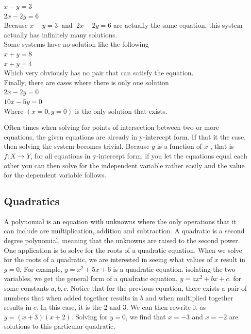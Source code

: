 \documentclass[12pt]{report}
\begin{document}
$x-y=3$\\
$2x-2y=6$\\
Because $x-y=3~$ and $~2x-2y=6$ are actually the same equation, this system actually has infinitely many solutions.\\
Some systems have no solution like the following\\
$x+y=8$\\
$x+y=4$\\
Which very obviously has no pair that can satisfy the equation.\\
Finally, there are cases where there is only one solution\\
$2x - 2y = 0$\\
$10x - 5y = 0$\\
Where $(x=0, y=0)$ is the only solution that exists.

Often times when solving for points of intersection between two or more equations, the given equations are already in y-intercept form. If that it the case, then solving the system becomes trivial. Because $y$ is a function of $x$ , that is $f: X \rightarrow Y$, for all equations in y-intercept form, if you let the equations equal each other you can then solve for the independent variable rather easily and the value for the dependent variable follows.

\subsection{Quadratics}

\hspace{\parindent}A polynomial is an equation with unknowns where the only operations that it can include are multiplication, addition and subtraction.
A quadratic is a second degree polynomial, meaning  that the unknowns are raised to the second power. One application is to solve for the roots of a quadratic equation. When we solve for the roots of a quadratic, we are interested in seeing what values of $x$ result in $y=0$. For example, $y=x^2+5x+6$ is a quadratic equation.
isolating the two variables, we get the general form of a quadratic equation, $y=ax^2+bx+c$. for some constants $a, b, c$. Notice that for the previous equation, there exists a pair of numbers that when added together results in $b$ and when multiplied together results in $c$. In this case, it is the $2$ and $3$. We can then rewrite it as $y=(x+3)(x+2)$. Solving for $y=0$, we find that $x=-3$ and $x=-2$ are solutions to this particular quadratic.

\end{document}
